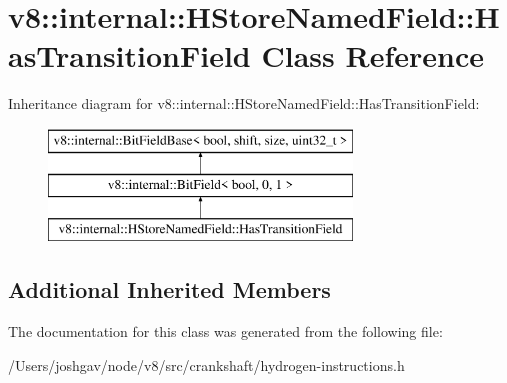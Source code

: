 \hypertarget{classv8_1_1internal_1_1_h_store_named_field_1_1_has_transition_field}{}\section{v8\+:\+:internal\+:\+:H\+Store\+Named\+Field\+:\+:Has\+Transition\+Field Class Reference}
\label{classv8_1_1internal_1_1_h_store_named_field_1_1_has_transition_field}
Inheritance diagram for v8\+:\+:internal\+:\+:H\+Store\+Named\+Field\+:\+:Has\+Transition\+Field\+:\begin{figure}[H]
\begin{center}
\leavevmode
\includegraphics[height=3.000000cm]{classv8_1_1internal_1_1_h_store_named_field_1_1_has_transition_field}
\end{center}
\end{figure}
\subsection*{Additional Inherited Members}


The documentation for this class was generated from the following file\+:\begin{DoxyCompactItemize}
\item 
/\+Users/joshgav/node/v8/src/crankshaft/hydrogen-\/instructions.\+h\end{DoxyCompactItemize}
